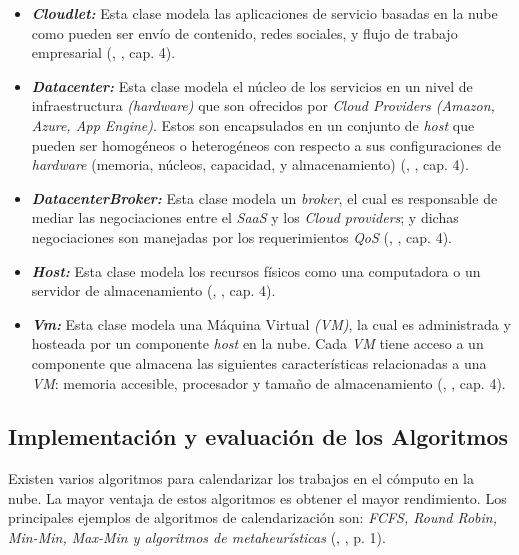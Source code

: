 \begin{itemize}
	\item \textit{\textbf{Cloudlet:}} Esta clase modela las aplicaciones de servicio basadas en la nube como pueden ser env\'io de contenido, redes sociales, y flujo de trabajo empresarial (\citeauthor{calheiros2011cloudsim}, \citeyear{calheiros2011cloudsim}, cap. 4).
	\item \textit{ \textbf{Datacenter:}} Esta clase modela el núcleo de los servicios en un nivel de infraestructura \textit{(hardware)} que son ofrecidos por \textit{Cloud Providers (Amazon, Azure, App Engine)}. Estos son encapsulados en un conjunto de \textit{host} que pueden ser homogéneos o heterogéneos con respecto a sus configuraciones de \textit{hardware} (memoria, n\'ucleos, capacidad, y almacenamiento) (\citeauthor{calheiros2011cloudsim}, \citeyear{calheiros2011cloudsim}, cap. 4).
	\item \textit{ \textbf{DatacenterBroker:}} Esta clase modela un \textit{broker}, el cual es responsable de mediar las negociaciones entre el \textit{SaaS} y los \textit{Cloud providers}; y dichas negociaciones son manejadas por los requerimientos \textit{QoS} (\citeauthor{calheiros2011cloudsim}, \citeyear{calheiros2011cloudsim}, cap. 4).
	\item  \textit{\textbf{Host:}} Esta clase modela los recursos f\'isicos como una computadora o un servidor de almacenamiento (\citeauthor{calheiros2011cloudsim}, \citeyear{calheiros2011cloudsim}, cap. 4).
	\item  \textit{\textbf{Vm:}} Esta clase modela una M\'aquina Virtual \textit{(VM)}, la cual es administrada y hosteada por un componente \textit{host} en la nube. Cada \textit{VM} tiene acceso a un componente que almacena las siguientes características relacionadas a una \textit{VM}: memoria accesible, procesador y tamaño de almacenamiento (\citeauthor{calheiros2011cloudsim}, \citeyear{calheiros2011cloudsim}, cap. 4).
\end{itemize}


\newpage

\subsection{Implementaci\'on y evaluación de los Algoritmos}

Existen varios algoritmos para calendarizar los trabajos en el c\'omputo en la nube. La mayor ventaja de estos algoritmos es obtener el mayor rendimiento. Los principales ejemplos de algoritmos de calendarizaci\'on son: \textit{FCFS, Round Robin, Min-Min, Max-Min y algoritmos de metaheurísticas}  (\citeauthor{shimpy2014different}, \citeyear{shimpy2014different}, p. 1).



